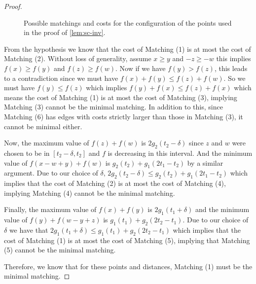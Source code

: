 \documentclass{article}
\begin{document}
\begin{proof}
\begin{figure}
    \caption{Possible matchings and costs for the configuration
    of the points used in the proof of
    \cref{lem:sc-inv}. } \label{img:lem.sc-inv}
    \end{figure}



   From the hypothesis we know that the cost of Matching (1) is
   at most the cost of Matching (2).
   Without loss of generality, assume $x\geq y$ and $-z\geq -w$ this implies $f(x)\geq f(y)$ and
   $f(z)\geq f(w)$. Now if we have $f(y)>f(z)$, this leads to  a contradiction
   since we must have $f(x)+f(y)\leq f(z)+f(w)$. So we must have
   $f(y)\leq f(z)$ which implies $f(y)+f(x)\leq f(z)+f(x)$ which means
   the cost of Matching (1) is at most the cost of Matching (3),
   implying Matching (3) cannot be the minimal matching. In addition
   to this, since Matching (6) has edges with costs strictly larger
   than those in Matching (3), it cannot be minimal either.

   Now, the maximum value of $f(z)+f(w)$ is
   $2g_2(t_2-\delta)$ since $z$ and $w$ were chosen to be in
   $[t_2-\delta,t_2]$ and $f$ is decreasing in this interval. And the
   minimum value of $f(x-w+y)+f(w)$ is $g_2(t_2)+g_1(2t_1-t_2)$ by a
   similar argument. Due to our choice of $\delta$,
   $2g_2(t_2-\delta)\leq g_2(t_2)+g_1(2t_1-t_2)$ which implies that
   the cost of Matching (2) is at most the cost of Matching (4),
   implying Matching (4) cannot be the minimal matching.

   Finally, the maximum value of $f(x)+f(y)$ is $2g_1(t_1+\delta)$ and
   the minimum value of $f(y)+f(w-y+z)$ is $g_1(t_1)+g_2(2t_2-t_1)$.
   Due to our choice of $\delta$ we have that $2g_1(t_1+\delta)\leq
   g_1(t_1)+g_2(2t_2-t_1)$ which implies that the cost of Matching (1)
   is at most the cost of Matching (5), implying that Matching (5)
   cannot be the minimal matching.

   Therefore, we know that for these points and distances, Matching (1) must be the minimal
   matching.
  \end{proof}
\end{document}

